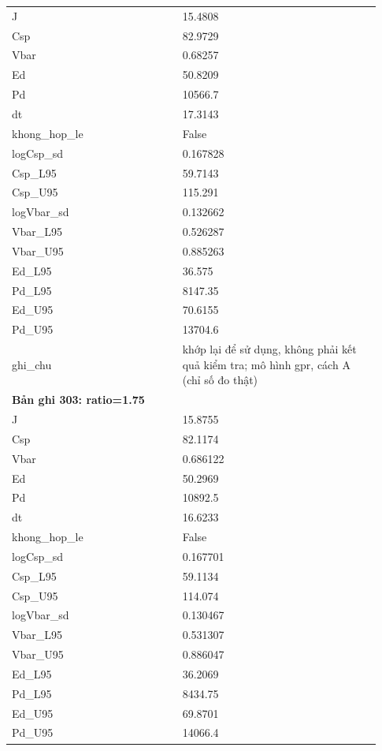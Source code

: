 \begin{longtable}{p{0.43\linewidth}p{0.50\linewidth}}
J & 15.4808 \\
Csp & 82.9729 \\
Vbar & 0.68257 \\
Ed & 50.8209 \\
Pd & 10566.7 \\
dt & 17.3143 \\
khong\_\allowbreak hop\_\allowbreak le & False \\
logCsp\_\allowbreak sd & 0.167828 \\
Csp\_\allowbreak L95 & 59.7143 \\
Csp\_\allowbreak U95 & 115.291 \\
logVbar\_\allowbreak sd & 0.132662 \\
Vbar\_\allowbreak L95 & 0.526287 \\
Vbar\_\allowbreak U95 & 0.885263 \\
Ed\_\allowbreak L95 & 36.575 \\
Pd\_\allowbreak L95 & 8147.35 \\
Ed\_\allowbreak U95 & 70.6155 \\
Pd\_\allowbreak U95 & 13704.6 \\
ghi\_\allowbreak chu & khớp lại để sử dụng, không phải kết quả kiểm tra; mô hình gpr, cách A (chỉ số đo thật) \\
\midrule
\multicolumn{2}{p{0.95\linewidth}}{\textbf{Bản ghi 303: ratio=1.75}} \\
J & 15.8755 \\
Csp & 82.1174 \\
Vbar & 0.686122 \\
Ed & 50.2969 \\
Pd & 10892.5 \\
dt & 16.6233 \\
khong\_\allowbreak hop\_\allowbreak le & False \\
logCsp\_\allowbreak sd & 0.167701 \\
Csp\_\allowbreak L95 & 59.1134 \\
Csp\_\allowbreak U95 & 114.074 \\
logVbar\_\allowbreak sd & 0.130467 \\
Vbar\_\allowbreak L95 & 0.531307 \\
Vbar\_\allowbreak U95 & 0.886047 \\
Ed\_\allowbreak L95 & 36.2069 \\
Pd\_\allowbreak L95 & 8434.75 \\
Ed\_\allowbreak U95 & 69.8701 \\
Pd\_\allowbreak U95 & 14066.4 \\

\end{longtable}
